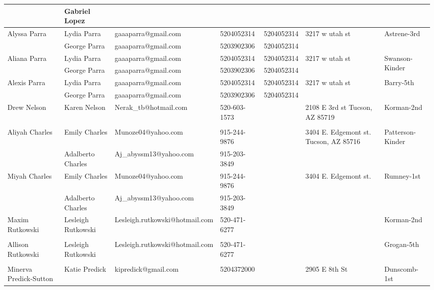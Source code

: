 \documentclass[landscape]{book}\usepackage[]{graphicx}\usepackage[]{color}
\begin{document}
\begin{longtable}{p{70pt}|p{75pt}|p{120pt}|p{60pt}|p{60pt}|p{100pt}|p{70pt}|}
 & Gabriel Lopez &  &  &  & & \\
\hline
\multirow{2}{70pt}{Alyssa Parra} & Lydia Parra & gaaaparra@gmail.com & 5204052314 & 5204052314 & \multirow{2}{100pt}{3217 w utah st} & \multirow{2}{70pt}{Astrene-3rd}\\
 & George Parra & gaaaparra@gmail.com & 5203902306 & 5204052314 & & \\
\hline
\multirow{2}{70pt}{Aliana Parra} & Lydia Parra & gaaaparra@gmail.com & 5204052314 & 5204052314 & \multirow{2}{100pt}{3217 w utah st} & \multirow{2}{70pt}{Swanson-Kinder}\\
 & George Parra & gaaaparra@gmail.com & 5203902306 & 5204052314 & & \\
\hline
\multirow{2}{70pt}{Alexis Parra} & Lydia Parra & gaaaparra@gmail.com & 5204052314 & 5204052314 & \multirow{2}{100pt}{3217 w utah st} & \multirow{2}{70pt}{Barry-5th}\\
 & George Parra & gaaaparra@gmail.com & 5203902306 & 5204052314 & & \\
\hline
\multirow{2}{70pt}{Drew Nelson} & Karen Nelson & Nerak\_tb@hotmail.com & 520-603-1573 &  & \multirow{2}{100pt}{2108 E 3rd st Tucson, AZ 85719} & \multirow{2}{70pt}{Korman-2nd}\\
 &  &  &  &  & & \\
\hline
\multirow{2}{70pt}{Aliyah Charles} & Emily Charles  & Munoze04@yahoo.com & 915-244-9876 &  & \multirow{2}{100pt}{3404 E. Edgemont st. Tucson, AZ 85716} & \multirow{2}{70pt}{Patterson-Kinder}\\
 & Adalberto Charles & Aj\_abyssm13@yahoo.com & 915-203-3849 &  & & \\
\hline
\multirow{2}{70pt}{Miyah Charles} & Emily Charles & Munoze04@yahoo.com & 915-244-9876 &  & \multirow{2}{100pt}{3404 E. Edgemont st.} & \multirow{2}{70pt}{Rumney-1st}\\
 & Adalberto Charles & Aj\_abyssm13@yahoo.com & 915-203-3849 &  & & \\
\hline
\multirow{2}{70pt}{Maxim Rutkowski } & Lesleigh Rutkowski  & Lesleigh.rutkowski@hotmail.com & 520-471-6277 &  & \multirow{2}{100pt}{} & \multirow{2}{70pt}{Korman-2nd}\\
 &  &  &  &  & & \\
\hline
\multirow{2}{70pt}{Allison Rutkowski } & Lesleigh Rutkowski  & Lesleigh.rutkowski@hotmail.com & 520-471-6277 &  & \multirow{2}{100pt}{} & \multirow{2}{70pt}{Grogan-5th}\\
 &  &  &  &  & & \\
\hline
\multirow{2}{70pt}{Minerva Predick-Sutton} & Katie Predick & kipredick@gmail.com & 5204372000 &  & \multirow{2}{100pt}{2905 E 8th St} & \multirow{2}{70pt}{Dunscomb-1st}\\

\end{longtable}
\end{document}
